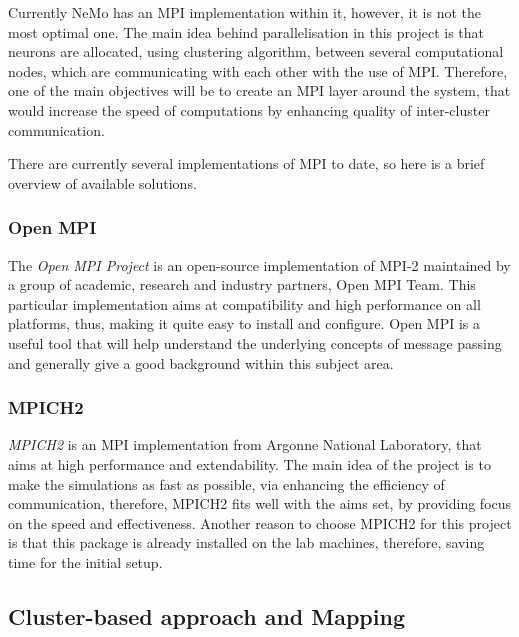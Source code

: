 Currently NeMo has an MPI implementation within it, however, it is not the most optimal one. The main idea behind parallelisation in this project is that neurons are allocated, 
using clustering algorithm, between several computational nodes, which are communicating with each other with the use of MPI. Therefore, one of the main objectives will be to 
create an MPI layer around the system, that would increase the speed of computations by enhancing quality of inter-cluster communication.

There are currently several implementations of MPI to date, so here is a brief overview of available solutions.

\subsubsection{Open MPI}

The \emph{Open MPI Project} is an open-source implementation of MPI-2 maintained by a group of academic, research and industry partners, Open MPI Team.\cite{RichardL.Graham2005} This particular 
implementation aims at compatibility and high performance on all platforms, thus, making it quite easy to install and configure. Open MPI is a useful tool that will help understand 
the underlying concepts of message passing and generally give a good background within this subject area.

\subsubsection{MPICH2}

\emph{MPICH2} is an MPI implementation from Argonne National Laboratory, that aims at high performance and extendability.\cite{W.Gropp1999} The main idea of the project is to make the simulations as
fast as possible, via enhancing the efficiency of communication, therefore, MPICH2 fits well with the aims set, by providing focus on the speed and effectiveness. Another reason to choose 
MPICH2 for this project is that this package is already installed on the lab machines, therefore, saving time for the initial setup.\cite{W.Gropp1999a}

\subsection{Cluster-based approach and Mapping}

